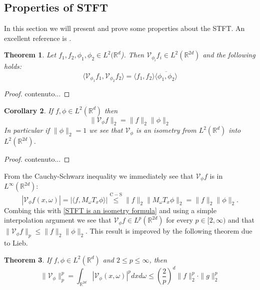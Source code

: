 \documentclass[corpo=11pt, stile=classica, tipotesi=custom,
greek, evenboxes, english]{toptesi}
\numberwithin{equation}{chapter}
\newtheorem{teo}{Theorem}[chapter] %
\newtheorem{cor}[teo]{Corollary}
\theoremstyle{remark}
\newcommand{\R}{\mathbb{R}} %
\newcommand{\V}{\mathcal{V}} %
\begin{document}
\subsection{Properties of STFT}
In this section we will present and prove some properties about the STFT. An excellent reference is \cite{grochenig}.
\begin{teo}\label{orthogonality relations theorem}
	Let $f_1,f_2,\phi_1,\phi_2 \in L^2(\R^d$). Then $\V_{\phi_i}f_i \in L^2(\R^{2d})$ and the following holds:
	\begin{equation}\label{orthogonality relation formula}
		\langle \V_{\phi_1} f_1, \V_{\phi_2} f_2 \rangle = \langle f_1, f_2 \rangle \overline{\langle \phi_1, \phi_2 \rangle}
	\end{equation}
\end{teo}
\begin{proof}
	contenuto...
\end{proof}
\begin{cor}
	If $f, \phi \in L^2(\R^d)$ then
	\begin{equation}\label{STFT is an isometry formula}
		\| \V_{\phi} f\|_2 = \| f \|_2 \| \phi \|_2
	\end{equation} 
	In particular if $\| \phi \|_2 = 1$ we see that $\V_{\phi}$ is an isometry from $L^2(\R^d)$ into $L^2(\R^{2d})$.
\end{cor}
\begin{proof}
	contenuto...
\end{proof}
From the Cauchy-Schwarz inequality we immediately see that $\V_{\phi} f$ is in $L^{\infty}(\R^{2d})$:
\begin{equation}\label{STFT is bounded}
	|\V_{\phi} f(x,\omega)| = |\langle f, M_{\omega} T_x \phi\rangle| \overset{\mathrm{C-S}}{\leq} \|f\|_2 \|M_{\omega}T_x \phi\|_2 = \|f\|_2 \|\phi\|_2.
\end{equation}
Combing this with \eqref{STFT is an isometry formula} and using a simple interpolation argument we see that $\V_{\phi}f \in L^p(\R^{2d})$ for every $p \in [2,\infty)$ and that $\|\V_{\phi}f\|_p \leq \|f\|_2 \|\phi\|_2$. This result is improved by the following theorem due to Lieb.
\begin{teo}\label{Lieb's inequality}
	If $f,\phi \in L^2(\R^d)$ and $2 \leq p \leq \infty$, then
	\begin{equation}\label{Lieb's inequality formula}
		\| \V_{\phi} \|_p^p = \int_{\R^{2d}} |\V_{\phi}(x,\omega)|^p dxd\omega \leq \left(\dfrac{2}{p}\right)^d \|f\|_2^p \cdot \|g\|_2^p
	\end{equation}
\end{teo}
\end{document}
